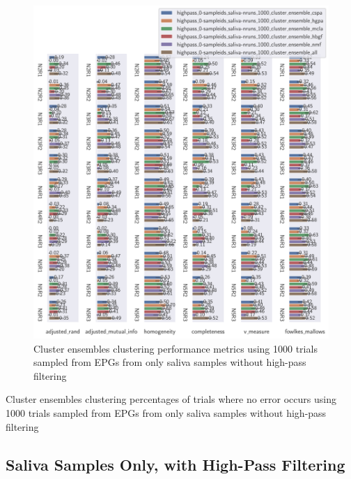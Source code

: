 \begin{theappendices}
\begin{figure}[H]
\centering
\includegraphics[width=\textwidth]{./figures/clust_comparison/highpass_0-sampleids_saliva-nruns_1000_cluster_ensembles.pdf}
\caption{Cluster ensembles clustering performance metrics using 1000 trials sampled from EPGs from only saliva samples without high-pass filtering}
\label{fig:highpass_0-sampleids_saliva-nruns_1000_cluster_ensembles}
\end{figure}

\begin{table}[H]
\centering
{}
\caption{Cluster ensembles clustering percentages of trials where no error occurs using 1000 trials sampled from EPGs from only saliva samples without high-pass filtering}
\label{table:highpass_0-sampleids_saliva-nruns_1000_cluster_ensembles}
\end{table}

\subsection{Saliva Samples Only, with High-Pass Filtering}


\end{theappendices}
